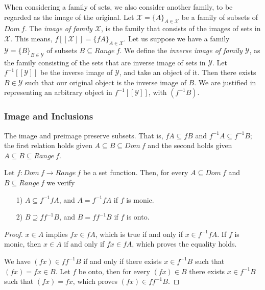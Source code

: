\documentclass [12pt]{book}
\begin{document}
When considering a family of sets, we also consider another family, to be regarded as the image of the original. Let $\mathcal{X}=\{A\}_{A\in\mathcal{X}}$ be a family of subsets of $Dom~f$. The \textit{image of family $\mathcal{X}$}, is the family that consists of the images of sets in $\mathcal{X}$. This means, $f[[\mathcal{X}]]=\{fA\}_{A\in\mathcal{X}}$. Let us suppose we have a family $\mathcal{Y}=\{B\}_{B\in\mathcal{Y}}$ of subsets $B\subseteq Range~f$. We define the \textit{inverse image of family $\mathcal{Y}$}, as the family consisting of the sets that are inverse image of sets in $\mathcal{Y}$. Let $f^{-1}[[\mathcal{Y}]]$ be the inverse image of $\mathcal{Y}$, and take an object of it. Then there exists $B\in\mathcal{Y}$ such that our original object is the inverse image of $B$. We are justified in representing an arbitrary object in $f^{-1}[[\mathcal{Y}]]$, with $(f^{-1}B)$.

		\subsubsection{Image and Inclusions}

The image and preimage preserve subsets. That is, $fA\subseteq fB$ and $f^{-1}A\subseteq f^{-1}B$; the first relation holds given $A\subseteq B\subseteq Dom~f$ and the second holds given $A\subseteq B\subseteq Range~f$.

\begin{proposition}Let $f:Dom~f\rightarrow Range~f$ be a set function. Then, for every $A\subseteq Dom~f$ and $B\subseteq Range~f$ we verify \begin{itemize}\item[1)]$A\subseteq f^{-1}fA$, and $A=f^{-1}fA$ if $f$ is monic.\item[2)]$B\supseteq ff^{-1}B$, and $B=ff^{-1}B$ if $f$ is onto.\end{itemize}\end{proposition}

\begin{proof}$x\in A$ implies $fx\in fA$, which is true if and only if $x\in f^{-1}fA$. If $f$ is monic, then $x\in A$ if and only if $fx\in fA$, which proves the equality holds.

We have $(fx)\in ff^{-1}B$ if and only if there exists $x\in f^{-1}B$ such that $(fx)=fx\in B$. Let $f$ be onto, then for every $(fx)\in B$ there exists $x\in f^{-1}B$ such that $(fx)=fx$, which proves $(fx)\in ff^{-1}B$.\end{proof}
\end{document}
